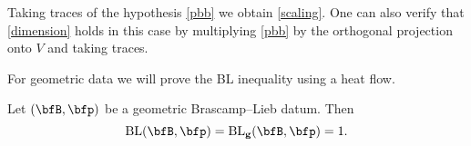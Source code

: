 \begin{remark}\label{blg-remark}
Taking traces of the hypothesis \eqref{pbb} we obtain \eqref{scaling}.
One can also verify that \eqref{dimension} holds in this case by multiplying \eqref{pbb} by the orthogonal projection onto $V$ and taking traces.
\end{remark}

For geometric data we will prove the BL inequality using a heat flow.

\begin{proposition}[{\cite{MR1008726,MR1650312}}]
\label{gbl-prop}
Let $(\bfB,\p)$ be a geometric Brascamp--Lieb datum.
Then
\begin{equation}\label{lieb-geom}
\BL(\bfB,\p) = \BLg(\bfB,\p) = 1.
\end{equation}
\end{proposition}

